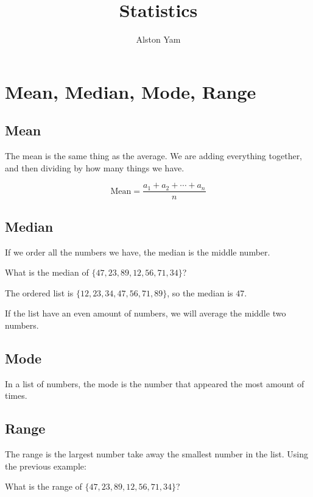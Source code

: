 \documentclass{article}
\title{Statistics}
\author{Alston Yam}
\date{}
\theoremstyle{mytheoremstyle}
\theoremstyle{mytheoremstyle}
\theoremstyle{myproblemstyle}
\theoremstyle{myproblemstyle}
\begin{document}
    \maketitle
    
    \section{Mean, Median, Mode, Range}
    \subsection{Mean}
    The mean is the same thing as the average. We are adding everything together, and then dividing by how many things we have.

    \begin{definition}[Mean]
        \[\text{Mean} = \frac{a_1 + a_2 + \cdots + a_n}{n}\]
    \end{definition}

    \subsection{Median}
    If we order all the numbers we have, the median is the middle number.

    \begin{example}
        What is the median of $\{47, 23, 89, 12, 56, 71, 34\}$?
    \end{example}

    The ordered list is $\{12, 23, 34, 47, 56, 71, 89\}$, so the median is $47$.

    If the list have an even amount of numbers, we will average the middle two numbers.

    \subsection{Mode}
    In a list of numbers, the mode is the number that appeared the most amount of times.

    \subsection{Range}
    The range is the largest number take away the smallest number in the list. Using the previous example:

    \begin{example}
        What is the range of $\{47, 23, 89, 12, 56, 71, 34\}$?
    \end{example}
\end{document}

